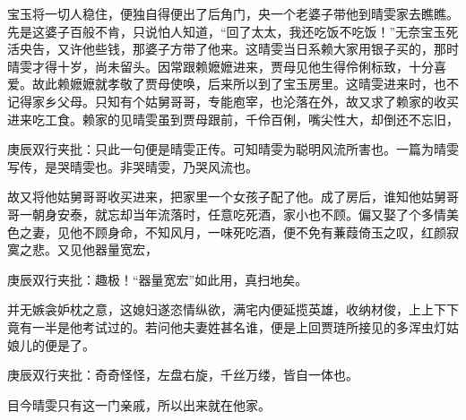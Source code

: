 \begin{parag}
    宝玉将一切人稳住，便独自得便出了后角门，央一个老婆子带他到晴雯家去瞧瞧。先是这婆子百般不肯，只说怕人知道，“回了太太，我还吃饭不吃饭！”无奈宝玉死活央告，又许他些钱，那婆子方带了他来。这晴雯当日系赖大家用银子买的，那时晴雯才得十岁，尚未留头。因常跟赖嬷嬷进来，贾母见他生得伶俐标致，十分喜爱。故此赖嬷嬷就孝敬了贾母使唤，后来所以到了宝玉房里。这晴雯进来时，也不记得家乡父母。只知有个姑舅哥哥，专能庖宰，也沦落在外，故又求了赖家的收买进来吃工食。赖家的见晴雯虽到贾母跟前，千伶百俐，嘴尖性大，却倒还不忘旧，\begin{note}庚辰双行夹批：只此一句便是晴雯正传。可知晴雯为聪明风流所害也。一篇为晴雯写传，是哭晴雯也。非哭晴雯，乃哭风流也。\end{note}故又将他姑舅哥哥收买进来，把家里一个女孩子配了他。成了房后，谁知他姑舅哥哥一朝身安泰，就忘却当年流落时，任意吃死酒，家小也不顾。偏又娶了个多情美色之妻，见他不顾身命，不知风月，一味死吃酒，便不免有蒹葭倚玉之叹，红颜寂寞之悲。又见他器量宽宏，\begin{note}庚辰双行夹批：趣极！“器量宽宏”如此用，真扫地矣。\end{note}并无嫉衾妒枕之意，这媳妇遂恣情纵欲，满宅内便延揽英雄，收纳材俊，上上下下竟有一半是他考试过的。若问他夫妻姓甚名谁，便是上回贾琏所接见的多浑虫灯姑娘儿的便是了。\begin{note}庚辰双行夹批：奇奇怪怪，左盘右旋，千丝万缕，皆自一体也。\end{note}目今晴雯只有这一门亲戚，所以出来就在他家。
\end{parag}


